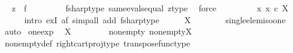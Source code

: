 \begin{isabellebody}
\ \isamarkupfalse%
\ {\isachardoublequoteopen}z\ {\isacharequal}{\kern0pt}\ f\isactrlsup {\isasymsharp}{\isachardoublequoteclose}\isanewline
\ \ \ \ \ \ \isamarkupfalse%
\ \ fsharp{\isacharunderscore}{\kern0pt}type\ same{\isacharunderscore}{\kern0pt}evals{\isacharunderscore}{\kern0pt}equal\ z{\isacharunderscore}{\kern0pt}type\ \isamarkupfalse%
\ force\isanewline
\ \ \isamarkupfalse%
\isanewline
\ \ \isamarkupfalse%
\ \isamarkupfalse%
\ {\isachardoublequoteopen}{\isasymexists}{\isacharbang}{\kern0pt}\ x{\isachardot}{\kern0pt}\ x\ {\isasymin}\isactrlsub c\ X\isactrlbsup {\isasymemptyset}\isactrlesup {\isachardoublequoteclose}\isanewline
\ \ \ \ \isamarkupfalse%
\ {\isacharparenleft}{\kern0pt}intro\ ex{}I{\isacharbrackleft}{\kern0pt}\ a{\isacharequal}{\kern0pt}{\isachardoublequoteopen}f\isactrlsup {\isasymsharp}{\isachardoublequoteclose}{\isacharbrackright}{\kern0pt}{\isacharcomma}{\kern0pt}\ simp{\isacharunderscore}{\kern0pt}all\ add{\isacharcolon}{\kern0pt}\ fsharp{\isacharunderscore}{\kern0pt}type{\isacharparenright}{\kern0pt}\isanewline
\ \ \isamarkupfalse%
\ \isamarkupfalse%
\ {\isachardoublequoteopen}X\isactrlbsup {\isasymemptyset}\isactrlesup \ {\isasymcong}\ {\isasymone}{\isachardoublequoteclose}\isanewline
\ \ \ \ \isamarkupfalse%
\ single{\isacharunderscore}{\kern0pt}elem{\isacharunderscore}{\kern0pt}iso{\isacharunderscore}{\kern0pt}one\ \isamarkupfalse%
\ auto\isanewline
{}\isamarkupfalse%
%
\endisatagproof
{\isafoldproof}%
%
\isadelimproof
\isanewline
%
\endisadelimproof
\isanewline
{}\isamarkupfalse%
\ one{\isacharunderscore}{\kern0pt}exp{\isacharcolon}{\kern0pt}\isanewline
\ \ {\isachardoublequoteopen}{\isasymone}\isactrlbsup X\isactrlesup \ {\isasymcong}\ {\isasymone}{\isachardoublequoteclose}\isanewline
%
\isadelimproof
%
\endisadelimproof
%
\isatagproof
{}\isamarkupfalse%
\ {\isacharminus}{\kern0pt}\ \isanewline
\ \ \isamarkupfalse%
\ nonempty{\isacharcolon}{\kern0pt}\ {\isachardoublequoteopen}nonempty{\isacharparenleft}{\kern0pt}{\isasymone}\isactrlbsup X\isactrlesup {\isacharparenright}{\kern0pt}{\isachardoublequoteclose}\isanewline
\ \ \ \ \isamarkupfalse%
\ nonempty{\isacharunderscore}{\kern0pt}def\ right{\isacharunderscore}{\kern0pt}cart{\isacharunderscore}{\kern0pt}proj{\isacharunderscore}{\kern0pt}type\ transpose{\isacharunderscore}{\kern0pt}func{\isacharunderscore}{\kern0pt}type\ \isamarkupfalse%

\end{isabellebody}
